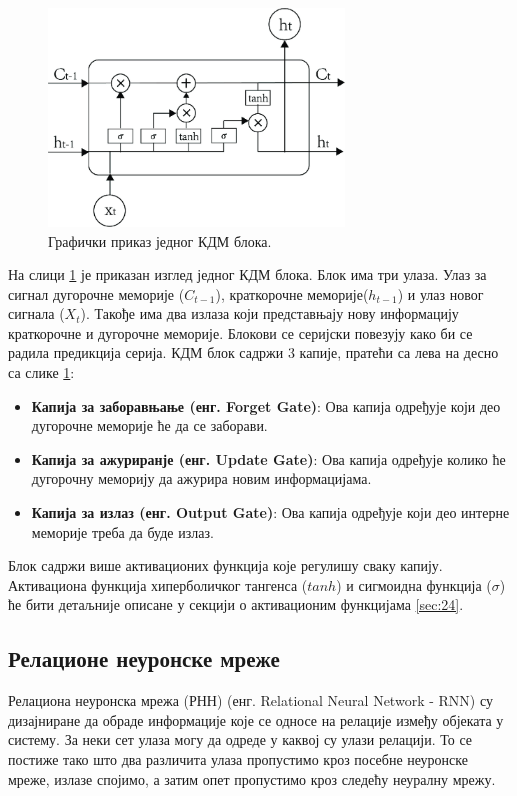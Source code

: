 \documentclass[a4paper, 12pt, master, utf8]{etf}
\begin{document}
\begin{figure}[h]
    \centering
    \includegraphics[width=0.7\textwidth]{images/LSTM.png}
    \caption{Графички приказ једног КДМ блока. \cite{qiu_forecasting_2020}}
    \label{fig:LSTM}
\end{figure}

На слици \ref{fig:LSTM} је приказан изглед једног КДМ блока. Блок има три улаза. Улаз за сигнал дугорочне меморије ($C_{t-1}$), краткорочне меморије($h_{t-1}$) и улаз новог сигнала ($X_t$). Такође има два излаза који представњају нову информацију краткорочне и дугорочне меморије.
Блокови се серијски повезују како би се радила предикција серија. КДМ блок садржи 3 капије, пратећи са лева на десно са слике \ref{fig:LSTM}:

\begin{itemize}[noitemsep]
    \item \textbf{Капија за заборавњање (енг. Forget Gate)}: Ова капија одређује који део дугорочне меморије ће да се заборави.
    \item \textbf{Капија за ажуриранје (енг. Update Gate)}: Ова капија одређује колико ће дугорочну меморију да ажурира новим информацијама.
    \item  \textbf{Капија за излаз (енг. Output Gate)}: Ова капија одређује који део интерне меморије треба да буде излаз.
\end{itemize}

Блок садржи више активационих функција које регулишу сваку капију. Активациона функција хиперболичког тангенса ($tanh$) и сигмоидна функција ($\sigma$) ће бити детаљније описане у секцији о активационим функцијама \ref{sec:24}.

\subsection{Релационе неуронске мреже}
\label{sec:234}
Релациона неуронска мрежа (РНН) (енг. Relational Neural Network - RNN) су дизајниране да обраде информације које се односе на релације између објеката у систему. За неки сет улаза могу да одреде у каквој су улази релацији.
То се постиже тако што два различита улаза пропустимо кроз посебне неуронске мреже, излазе спојимо, а затим опет пропустимо кроз следећу неуралну мрежу.
\end{document}
